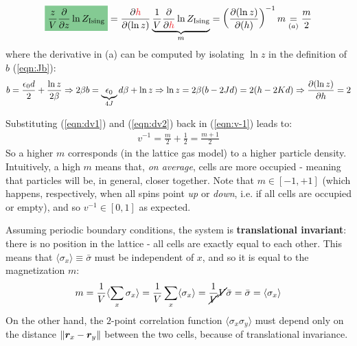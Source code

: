 \documentclass[../template.tex]{subfiles}
\begin{document}
\begin{align}\label{eqn:dv2}
    \hlc{ForestGreen}{\frac{z}{V} \pdv{z} \ln Z_{\mathrm{Ising} }} =  \pdv{\textcolor{Red}{h}}{(\ln z)} \underbrace{\frac{1}{V}\pdv{\textcolor{Red}{h}} \ln Z_{\mathrm{Ising}}}_{m} = \left(\pdv{(\ln z)}{(h)}\right)^{-1} m \underset{(a)}{=}  \frac{m}{2} 
\end{align}
where the derivative in (a) can be computed by isolating $\ln z$ in the definition of $b$ (\ref{eqn:Jb}):
\begin{align*}
    b = \frac{\epsilon_0 d}{2} + \frac{\ln z}{2 \beta} \Rightarrow 2 \beta b = \underbrace{\epsilon_0 }_{4J}d \beta + \ln z \Rightarrow \ln z = 2\beta(b - 2 J d) = 2(h- 2 K d) \Rightarrow \pdv{(\ln z)}{h} = 2
\end{align*}

Substituting (\ref{eqn:dv1}) and (\ref{eqn:dv2}) back in (\ref{eqn:v-1}) leads to:
\begin{align}\label{eqn:v-density}
    v^{-1} = \frac{m}{2} + \frac{1}{2} = \frac{m+1}{2}   
\end{align}
So a higher $m$ corresponds (in the lattice gas model) to a higher particle density. Intuitively, a high $m$ means that, \textit{on average}, cells are more occupied - meaning that particles will be, in general, closer together. Note that $m \in [-1,+1]$ (which happens, respectively, when all spins point \textit{up} or \textit{down}, i.e. if all cells are occupied or empty), and so $v^{-1} \in [0, 1]$ as expected. 

\medskip

Assuming periodic boundary conditions, the system is \textbf{translational invariant}: there is no  position in the lattice - all cells are exactly equal to each other. This means that $\langle \sigma_x \rangle \equiv \bar{\sigma}$ must be independent of $x$, and so it is equal to the magnetization $m$:
\begin{align*}
    m = \frac{1}{V} \langle \sum_x \sigma_x \rangle =  \frac{1}{V} \sum_x \langle \sigma_x \rangle = \frac{1}{\cancel{V}} \cancel{V} \bar{\sigma} = \bar{\sigma} = \langle \sigma_x \rangle
\end{align*}
On the other hand, the $2$-point correlation function $\langle \sigma_x \sigma_y \rangle$ must depend only on the distance $\norm{\bm{r}_x - \bm{r}_y}$ between the two cells, because of translational invariance. 

\medskip
\end{document}
